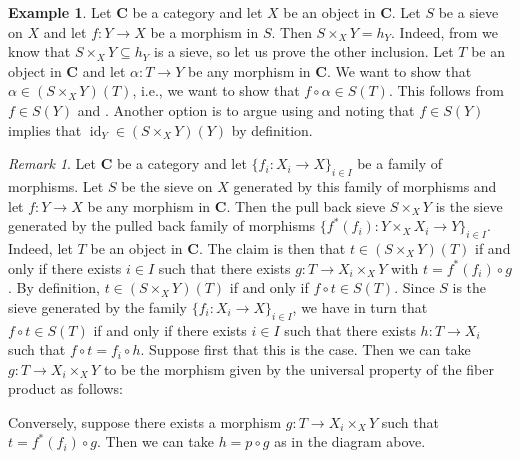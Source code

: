 \documentclass[12pt,reqno,a4paper]{amsart}
\theoremstyle{plain}
\theoremstyle{definition}
\newtheorem{exmp}[thm]{Example}
\theoremstyle{remark}
\newtheorem{rem}[thm]{Remark}
\begin{document}
\begin{exmp}\label{exmp:pullbacksieve}
  Let $\mathbf{C}$ be a category and let $X$ be an object in $\mathbf{C}$.
  Let $S$ be a sieve on $X$ and let $f \colon Y \to X$ be a morphism in $S$.
  Then $S \times_{X} Y = h_{Y}$.
  Indeed, from  we know that $S \times_{X} Y \subseteq h_{Y}$ is a sieve, so let us prove the other inclusion.
  Let $T$ be an object in $\mathbf{C}$ and let $\alpha \colon T \to Y$ be any morphism in $\mathbf{C}$.
  We want to show that $\alpha \in (S \times_{X} Y)(T)$, i.e., we want to show that $f \circ \alpha \in S(T)$.
  This follows from $f \in S(Y)$ and .
  Another option is to argue using  and noting that $f \in S(Y)$ implies that $\operatorname{id}_{Y} \in (S \times_{X} Y)(Y)$ by definition.
\end{exmp}

\begin{rem}\label{rem:pullback}
  Let $\mathbf{C}$ be a category and let $\{ f_{i} \colon X_{i} \to X \}_{i \in I}$ be a family of morphisms.
  Let $S$ be the sieve on $X$ generated by this family of morphisms and let $f \colon Y \to X$ be any morphism in $\mathbf{C}$.
  Then the pull back sieve $S \times_{X} Y$ is the sieve generated by the pulled back family of morphisms $\{ f^{*}(f_{i}) \colon Y \times_{X} X_{i} \to Y \}_{i \in I}$.
  Indeed, let $T$ be an object in $\mathbf{C}$.
  The claim is then that $t \in (S \times_{X} Y)(T)$ if and only if there exists $i \in I$ such that there exists $g \colon T \to X_{i} \times_{X} Y$ with $t = f^{*}(f_{i}) \circ g$.
  By definition, $t \in (S \times_{X} Y)(T)$ if and only if $f \circ t \in S(T)$.
  Since $S$ is the sieve generated by the family $\{f_{i} \colon X_{i} \to X \}_{i \in I}$, we have in turn that $f \circ t \in S(T)$ if and only if there exists $i \in I$ such that there exists $h \colon T \to X_{i}$ such that $f \circ t = f_{i} \circ h$.
  Suppose first that this is the case.
  Then we can take $g \colon T \to X_{i} \times_{X} Y$ to be the morphism given by the universal property of the fiber product as follows:
  \begin{center}
  \end{center}
  Conversely, suppose there exists a morphism $g \colon T \to X_{i} \times_{X} Y$ such that $t = f^{*}(f_{i}) \circ g$.
  Then we can take $h = p \circ g$ as in the diagram above.
\end{rem}
\end{document}
